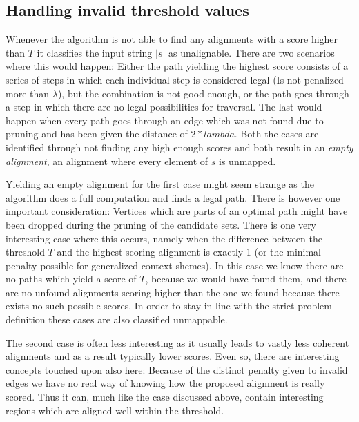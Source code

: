 \documentclass[thesis.tex]{subfiles}
\begin{document}
\subsection{Handling invalid threshold values}
Whenever the algorithm is not able to find any alignments with a score higher than $T$ it classifies the input string $|s|$ as unalignable. There are two scenarios where this would happen: Either the path yielding the highest score consists of a series of steps in which each individual step is considered legal (Is not penalized more than $\lambda$), but the combination is not good enough, or the path goes through a step in which there are no legal possibilities for traversal. The last would happen when every path goes through an edge which was not found due to pruning and has been given the distance of $2*lambda$. Both the cases are identified through not finding any high enough scores and both result in an \textit{empty alignment}, an alignment where every element of $s$ is unmapped. \\
\par\noindent
Yielding an empty alignment for the first case might seem strange as the algorithm does a full computation and finds a legal path. There is however one important consideration: Vertices which are parts of an optimal path might have been dropped during the pruning of the candidate sets. There is one very interesting case where this occurs, namely when the difference between the threshold $T$ and the highest scoring alignment is exactly 1 (or the minimal penalty possible for generalized context shemes). In this case we know there are no paths which yield a score of $T$, because we would have found them, and there are no unfound alignments scoring higher than the one we found because there exists no such possible scores. In order to stay in line with the strict problem definition these cases are also classified unmappable.\\
\par\noindent
The second case is often less interesting as it usually leads to vastly less coherent alignments and as a result typically lower scores. Even so, there are interesting concepts touched upon also here: Because of the distinct penalty given to invalid edges we have no real way of knowing how the proposed alignment is really scored. Thus it can, much like the case discussed above, contain interesting regions which are aligned well within the threshold.
\end{document}
